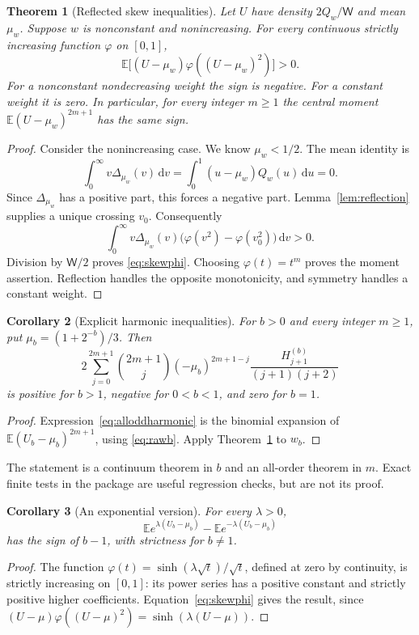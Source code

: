 \documentclass[11pt]{article}
\numberwithin{equation}{section}
\newtheorem{theorem}{Theorem}[section]
\newtheorem{corollary}[theorem]{Corollary}
\theoremstyle{definition}
\theoremstyle{remark}
\newcommand{\dd}{\,\mathrm d}
\newcommand{\E}{\mathbb E}
\newcommand{\Qw}{Q_w}
\newcommand{\Wtot}{\mathsf W}
\begin{document}
\begin{theorem}[Reflected skew inequalities]\label{thm:skew}
Let $U$ have density $2\Qw/\Wtot$ and mean $\mu_w$. Suppose $w$ is
nonconstant and nonincreasing. For every continuous strictly increasing
function $\varphi$ on $[0,1]$,
\begin{equation}\label{eq:skewphi}
 \E\big[(U-\mu_w)\varphi((U-\mu_w)^2)\big]>0.
\end{equation}
For a nonconstant nondecreasing weight the sign is negative.
For a constant weight it is zero. In particular, for every integer
$m\ge1$ the central moment $\E(U-\mu_w)^{2m+1}$ has the same sign.
\end{theorem}
\begin{proof}
Consider the nonincreasing case. We know $\mu_w<1/2$.
The mean identity is
\[
 \int_0^\infty v\Delta_{\mu_w}(v)\dd v
       =\int_0^1(u-\mu_w)\Qw(u)\dd u=0.
\]
Since $\Delta_{\mu_w}$ has a positive part, this forces a negative
part. Lemma~\ref{lem:reflection} supplies a unique crossing $v_0$.
Consequently
\[
 \int_0^\infty v\Delta_{\mu_w}(v)
             \bigl(\varphi(v^2)-\varphi(v_0^2)\bigr)\dd v>0.
\]
Division by $\Wtot/2$ proves \eqref{eq:skewphi}. Choosing
$\varphi(t)=t^m$ proves the moment assertion. Reflection handles the
opposite monotonicity, and symmetry handles a constant weight.
\end{proof}

\begin{corollary}[Explicit harmonic inequalities]\label{cor:harmonic}
For $b>0$ and every integer $m\ge1$, put $\mu_b=(1+2^{-b})/3$.
Then
\begin{equation}\label{eq:alloddharmonic}
 2\sum_{j=0}^{2m+1}\binom{2m+1}{j}(-\mu_b)^{2m+1-j}
       \frac{H_{j+1}^{(b)}}{(j+1)(j+2)}
\end{equation}
is positive for $b>1$, negative for $0<b<1$, and zero for $b=1$.
\end{corollary}
\begin{proof}
Expression~\eqref{eq:alloddharmonic} is the binomial expansion of
$\E(U_b-\mu_b)^{2m+1}$, using \eqref{eq:rawb}. Apply
Theorem~\ref{thm:skew} to $w_b$.
\end{proof}

The statement is a continuum theorem in $b$ and an all-order theorem
in $m$. Exact finite tests in the package are useful regression checks,
but are not its proof.

\begin{corollary}[An exponential version]\label{cor:mgf}
For every $\lambda>0$,
\[
 \E e^{\lambda(U_b-\mu_b)}-
 \E e^{-\lambda(U_b-\mu_b)}
\]
has the sign of $b-1$, with strictness for $b\ne1$.
\end{corollary}
\begin{proof}
The function $\varphi(t)=\sinh(\lambda\sqrt t)/\sqrt t$, defined at
zero by continuity, is strictly increasing on $[0,1]$: its power
series has a positive constant and strictly positive higher
coefficients. Equation~\eqref{eq:skewphi} gives the result, since
$(U-\mu)\varphi((U-\mu)^2)=\sinh(\lambda(U-\mu))$.
\end{proof}
\end{document}
